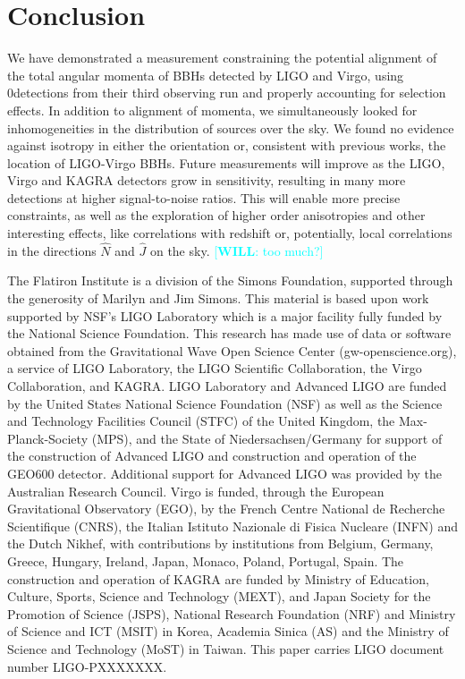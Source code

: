 \documentclass[aps,prd,twocolumn,superscriptaddress,preprintnumbers,floatfix,nofootinbib]{revtex4-2}
\newcommand*{\wf}[1]{\textcolor{cyan}{[\textbf{WILL}: #1]}}
\newcommand{\dcc}{LIGO-PXXXXXXX}
\newcommand{\Nevents}{0}
\begin{document}
\section{Conclusion}
\label{sec:conclusion}

We have demonstrated a measurement constraining the potential alignment of the total angular momenta of \acp{BBH} detected by LIGO and Virgo, using \Nevents detections from their third observing run and properly accounting for selection effects.
In addition to alignment of momenta, we simultaneously looked for inhomogeneities in the distribution of sources over the sky.
We found no evidence against isotropy in either the orientation or, consistent with previous works, the location of LIGO-Virgo \acp{BBH}.
Future measurements will improve as the LIGO, Virgo and KAGRA detectors grow in sensitivity, resulting in many more detections at higher signal-to-noise ratios.
This will enable more precise constraints, as well as the exploration of higher order anisotropies and other interesting effects, like correlations with redshift or, potentially, local correlations in the directions $\hat{N}$ and $\hat{J}$ on the sky.  \wf{too much?}

\begin{acknowledgments}
The Flatiron Institute is a division of the Simons Foundation, supported through the generosity of Marilyn and Jim Simons.
This material is based upon work supported by NSF's LIGO Laboratory which is a major facility fully funded by the National Science Foundation.
This research has made use of data or software obtained from the Gravitational Wave Open Science Center (gw-openscience.org), a service of LIGO Laboratory, the LIGO Scientific Collaboration, the Virgo Collaboration, and KAGRA. LIGO Laboratory and Advanced LIGO are funded by the United States National Science Foundation (NSF) as well as the Science and Technology Facilities Council (STFC) of the United Kingdom, the Max-Planck-Society (MPS), and the State of Niedersachsen/Germany for support of the construction of Advanced LIGO and construction and operation of the GEO600 detector. Additional support for Advanced LIGO was provided by the Australian Research Council. Virgo is funded, through the European Gravitational Observatory (EGO), by the French Centre National de Recherche Scientifique (CNRS), the Italian Istituto Nazionale di Fisica Nucleare (INFN) and the Dutch Nikhef, with contributions by institutions from Belgium, Germany, Greece, Hungary, Ireland, Japan, Monaco, Poland, Portugal, Spain. The construction and operation of KAGRA are funded by Ministry of Education, Culture, Sports, Science and Technology (MEXT), and Japan Society for the Promotion of Science (JSPS), National Research Foundation (NRF) and Ministry of Science and ICT (MSIT) in Korea, Academia Sinica (AS) and the Ministry of Science and Technology (MoST) in Taiwan.
This paper carries LIGO document number \dcc{}.
\end{acknowledgments}
\end{document}
